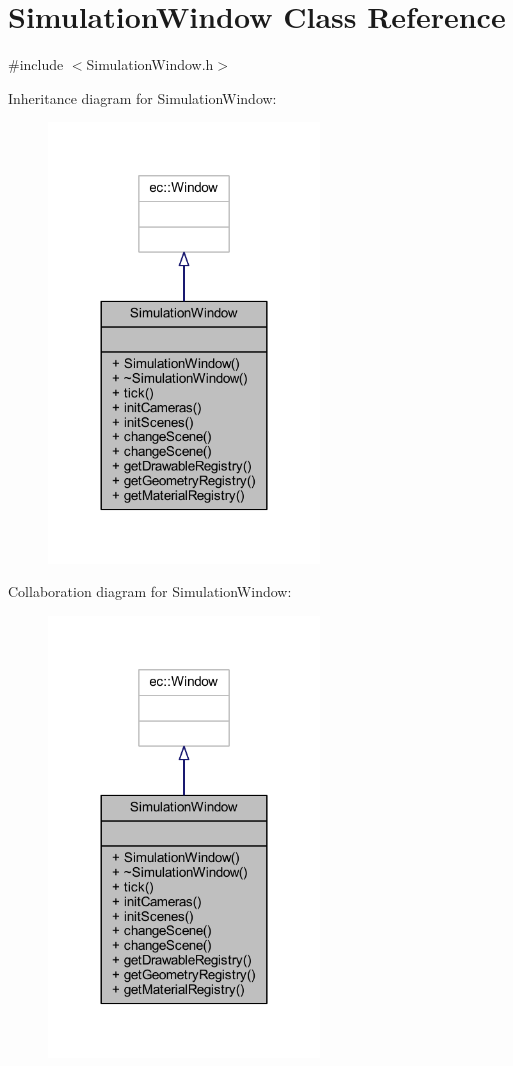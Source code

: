 \hypertarget{class_simulation_window}{}\section{Simulation\+Window Class Reference}
\label{class_simulation_window}


{\ttfamily \#include $<$Simulation\+Window.\+h$>$}



Inheritance diagram for Simulation\+Window\+:\nopagebreak
\begin{figure}[H]
\begin{center}
\leavevmode
\includegraphics[width=204pt]{class_simulation_window__inherit__graph}
\end{center}
\end{figure}


Collaboration diagram for Simulation\+Window\+:\nopagebreak
\begin{figure}[H]
\begin{center}
\leavevmode
\includegraphics[width=204pt]{class_simulation_window__coll__graph}
\end{center}
\end{figure}
